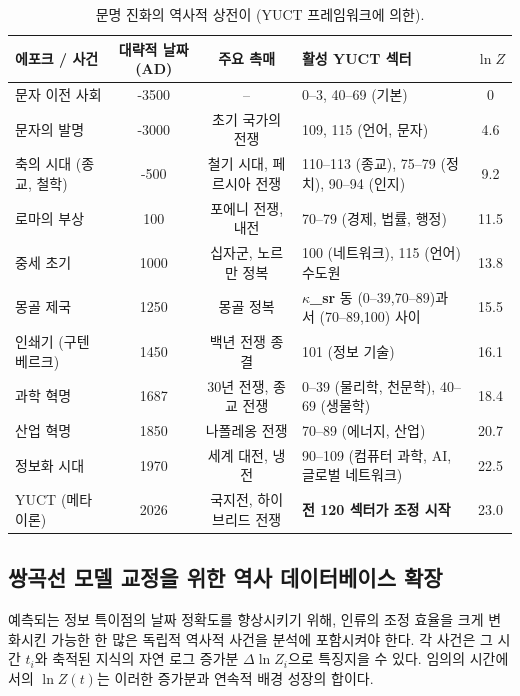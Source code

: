 \documentclass[12pt,a4paper]{article}
\theoremstyle{remark}
\begin{document}
	\begin{table}[htbp]
		\centering
		\caption{문명 진화의 역사적 상전이 (YUCT 프레임워크에 의한).}
		\label{tab:historical-transitions}
		\scriptsize  
		\begin{tabular}{p{2.2cm} c c p{5.5cm} c}
			\toprule
			\textbf{에포크 / 사건} & \textbf{대략적 날짜 (AD)} & \textbf{주요 촉매} & \textbf{활성 YUCT 섹터} & $\ln Z$ \\
			\midrule
			문자 이전 사회 & -3500 & – & 0–3, 40–69 (기본) & 0 \\
			문자의 발명 & -3000 & 초기 국가의 전쟁 & 109, 115 (언어, 문자) & 4.6 \\
			축의 시대 (종교, 철학) & -500 & 철기 시대, 페르시아 전쟁 & 110–113 (종교), 75–79 (정치), 90–94 (인지) & 9.2 \\
			로마의 부상 & 100 & 포에니 전쟁, 내전 & 70–79 (경제, 법률, 행정) & 11.5 \\
			중세 초기 & 1000 & 십자군, 노르만 정복 & 100 (네트워크), 115 (언어) 수도원 & 13.8 \\
			몽골 제국 & 1250 & 몽골 정복 & \textbf{$\kappa$\_sr} 동 (0–39,70–89)과 서 (70–89,100) 사이 & 15.5 \\
			인쇄기 (구텐베르크) & 1450 & 백년 전쟁 종결 & 101 (정보 기술) & 16.1 \\
			과학 혁명 & 1687 & 30년 전쟁, 종교 전쟁 & 0–39 (물리학, 천문학), 40–69 (생물학) & 18.4 \\
			산업 혁명 & 1850 & 나폴레옹 전쟁 & 70–89 (에너지, 산업) & 20.7 \\
			정보화 시대 & 1970 & 세계 대전, 냉전 & 90–109 (컴퓨터 과학, AI, 글로벌 네트워크) & 22.5 \\
			YUCT (메타 이론) & 2026 & 국지전, 하이브리드 전쟁 & \textbf{전 120 섹터가 조정 시작} & 23.0 \\
			\bottomrule
		\end{tabular}
	\end{table}
	
	\subsection{쌍곡선 모델 교정을 위한 역사 데이터베이스 확장}
	\label{subsec:historical-data}
	
	예측되는 정보 특이점의 날짜 정확도를 향상시키기 위해, 인류의 조정 효율을 크게 변화시킨 가능한 한 많은 독립적 역사적 사건을 분석에 포함시켜야 한다. 각 사건은 그 시간 \(t_i\)와 축적된 지식의 자연 로그 증가분 \(\Delta \ln Z_i\)으로 특징지을 수 있다. 임의의 시간에서의 \(\ln Z(t)\)는 이러한 증가분과 연속적 배경 성장의 합이다.
	
\end{document}
